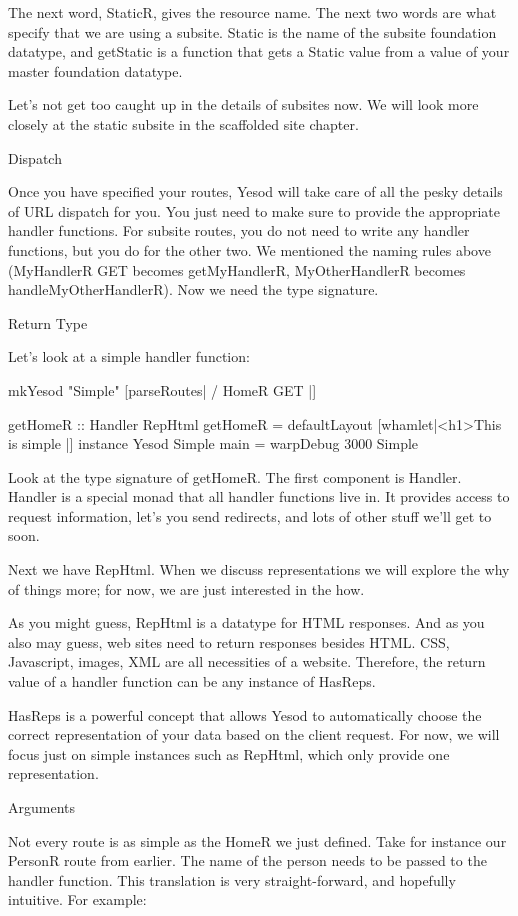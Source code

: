 The next word, StaticR, gives the resource name. The next two words
are what specify that we are using a subsite. Static is the name of
the subsite foundation datatype, and getStatic is a function that gets
a Static value from a value of your master foundation datatype.

Let's not get too caught up in the details of subsites now. We will
look more closely at the static subsite in the scaffolded site
chapter.

Dispatch

Once you have specified your routes, Yesod will take care of all the
pesky details of URL dispatch for you. You just need to make sure to
provide the appropriate handler functions. For subsite routes, you do
not need to write any handler functions, but you do for the other
two. We mentioned the naming rules above (MyHandlerR GET becomes
getMyHandlerR, MyOtherHandlerR becomes handleMyOtherHandlerR). Now we
need the type signature.

Return Type

Let's look at a simple handler function:

mkYesod "Simple" [parseRoutes|
/ HomeR GET
|]

getHomeR :: Handler RepHtml
getHomeR = defaultLayout [whamlet|<h1>This is simple
|]
instance Yesod Simple
main = warpDebug 3000 Simple

Look at the type signature of getHomeR. The first component is
Handler. Handler is a special monad that all handler functions live
in. It provides access to request information, let's you send
redirects, and lots of other stuff we'll get to soon.

Next we have RepHtml. When we discuss representations we will explore
the why of things more; for now, we are just interested in the how.

As you might guess, RepHtml is a datatype for HTML responses. And as
you also may guess, web sites need to return responses besides
HTML. CSS, Javascript, images, XML are all necessities of a
website. Therefore, the return value of a handler function can be any
instance of HasReps.

HasReps is a powerful concept that allows Yesod to automatically
choose the correct representation of your data based on the client
request. For now, we will focus just on simple instances such as
RepHtml, which only provide one representation.

Arguments

Not every route is as simple as the HomeR we just defined. Take for
instance our PersonR route from earlier. The name of the person needs
to be passed to the handler function. This translation is very
straight-forward, and hopefully intuitive. For example:

